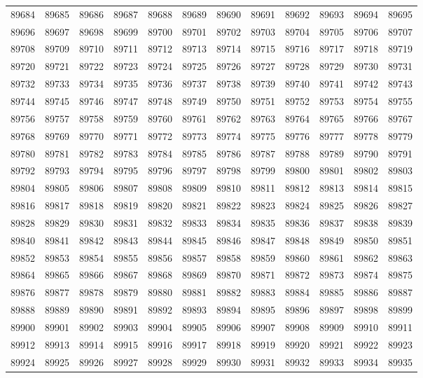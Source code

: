 \begin{center}
\begin{longtable}{llllllllllll}
89684 &89685 &89686 &89687 &89688 &89689 &89690 &89691 &89692 &89693 &89694 &89695 \\
89696 &89697 &89698 &89699 &89700 &89701 &89702 &89703 &89704 &89705 &89706 &89707 \\
89708 &89709 &89710 &89711 &89712 &89713 &89714 &89715 &89716 &89717 &89718 &89719 \\
89720 &89721 &89722 &89723 &89724 &89725 &89726 &89727 &89728 &89729 &89730 &89731 \\
89732 &89733 &89734 &89735 &89736 &89737 &89738 &89739 &89740 &89741 &89742 &89743 \\
89744 &89745 &89746 &89747 &89748 &89749 &89750 &89751 &89752 &89753 &89754 &89755 \\
89756 &89757 &89758 &89759 &89760 &89761 &89762 &89763 &89764 &89765 &89766 &89767 \\
89768 &89769 &89770 &89771 &89772 &89773 &89774 &89775 &89776 &89777 &89778 &89779 \\
89780 &89781 &89782 &89783 &89784 &89785 &89786 &89787 &89788 &89789 &89790 &89791 \\
89792 &89793 &89794 &89795 &89796 &89797 &89798 &89799 &89800 &89801 &89802 &89803 \\
89804 &89805 &89806 &89807 &89808 &89809 &89810 &89811 &89812 &89813 &89814 &89815 \\
89816 &89817 &89818 &89819 &89820 &89821 &89822 &89823 &89824 &89825 &89826 &89827 \\
89828 &89829 &89830 &89831 &89832 &89833 &89834 &89835 &89836 &89837 &89838 &89839 \\
89840 &89841 &89842 &89843 &89844 &89845 &89846 &89847 &89848 &89849 &89850 &89851 \\
89852 &89853 &89854 &89855 &89856 &89857 &89858 &89859 &89860 &89861 &89862 &89863 \\
89864 &89865 &89866 &89867 &89868 &89869 &89870 &89871 &89872 &89873 &89874 &89875 \\
89876 &89877 &89878 &89879 &89880 &89881 &89882 &89883 &89884 &89885 &89886 &89887 \\
89888 &89889 &89890 &89891 &89892 &89893 &89894 &89895 &89896 &89897 &89898 &89899 \\
89900 &89901 &89902 &89903 &89904 &89905 &89906 &89907 &89908 &89909 &89910 &89911 \\
89912 &89913 &89914 &89915 &89916 &89917 &89918 &89919 &89920 &89921 &89922 &89923 \\
89924 &89925 &89926 &89927 &89928 &89929 &89930 &89931 &89932 &89933 &89934 &89935 \\

\end{longtable}
\end{center}
